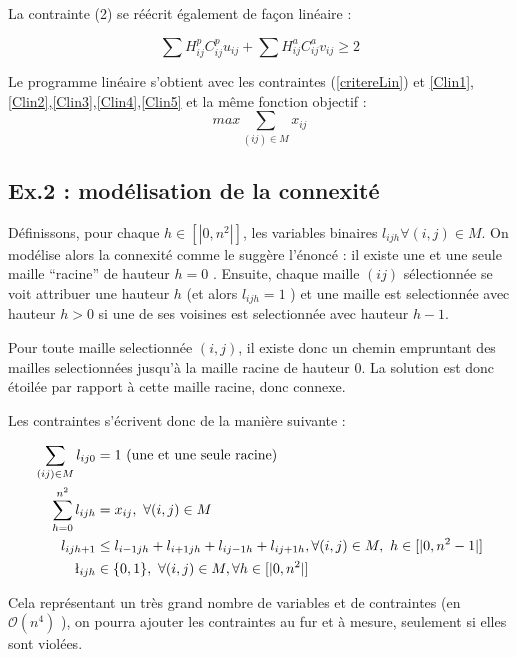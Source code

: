 \documentclass[12pt,a4paper]{article}
\begin{document}
La contrainte (2) se réécrit également de façon linéaire :

\begin{equation} \label{critereLin}
\sum H_{ij}^p C_{ij}^p u_{ij} + \sum H_{ij}^aC_{ij}^a v_{ij} \geq 2
\end{equation}

Le programme linéaire s'obtient avec les contraintes (\ref{critereLin}) et \ref{Clin1}, \ref{Clin2},\ref{Clin3},\ref{Clin4},\ref{Clin5} et la même fonction objectif : $$max \sum_{(ij)\in M} x_{ij}$$

\vspace{1cm}


\subsection{Ex.2 : modélisation de la connexité }

Définissons, pour chaque $h\in [| 0,n^2 |] $, les variables binaires $ l_{ijh} \forall (i,j) \in M$.
On modélise alors la connexité comme le suggère l'énoncé : il existe une et une seule maille ``racine''  de hauteur $h=0$ . Ensuite, chaque maille $(ij)$ sélectionnée se voit attribuer une hauteur $h$ (et alors $l_{ijh}=1$ ) et une maille est selectionnée avec hauteur $h>0$ si une de ses voisines est selectionnée avec hauteur $h-1$.

Pour toute maille selectionnée $(i,j)$, il existe donc un chemin empruntant des mailles selectionnées jusqu'à la maille racine de hauteur 0. La solution est donc étoilée par rapport à cette maille racine, donc connexe.

Les contraintes s'écrivent donc de la manière suivante : 

\begin{align} \label{Cconnex}
\sum_{(ij)\in M} l_{ij0} &= 1 \ \text{(une et une seule racine)} \\
\sum_{h=0}^{n^2} l_{ijh} &= x_{ij} , \ \forall (i,j) \in M \\
l_{ijh+1} & \leq l_{i-1jh} +l_{i+1jh} +l_{ij-1h} +l_{ij+1h}, \forall (i,j) \in M, \ h\in [|0, n^2 -1|] \\
\l_{ijh} & \in \{0,1\} , \ \forall (i,j) \in M, \forall h\in [|0, n^2|] 
\end{align}

Cela représentant un très grand nombre de variables et de contraintes (en $\mathcal{O}(n^4) $ ), on pourra ajouter les contraintes au fur et à mesure, seulement si elles sont violées.
\end{document}
